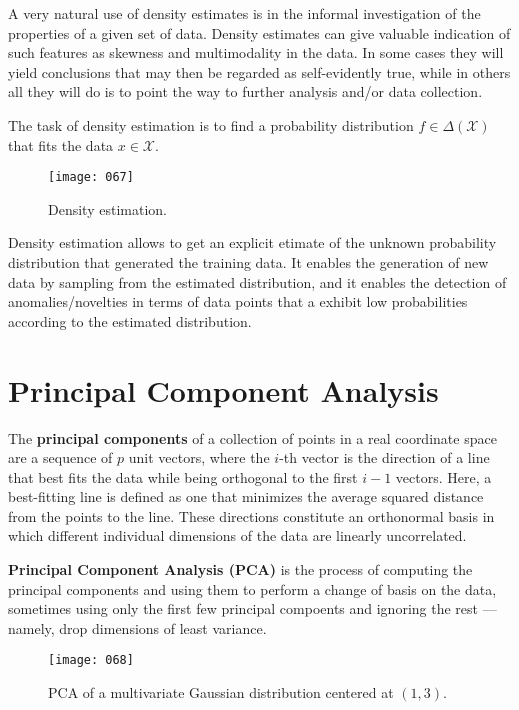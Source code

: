A very natural use of density estimates is in the informal investigation of the properties of a given set of data. Density estimates can give valuable indication of such features as skewness and multimodality in the data. In some cases they will yield conclusions that may then be regarded as self-evidently true, while in others all they will do is to point the way to further analysis and/or data collection.

The task of density estimation is to find a probability distribution \(f \in \Delta(\mathcal{X})\) that fits the data \(x \in \mathcal{X}\).

\begin{figure}[h!]
    \centering
    \texttt{[image: 067]}
    \caption{Density estimation.}
    \label{fig:067}
\end{figure}

Density estimation allows to get an explicit etimate of the unknown probability distribution that generated the training data. It enables the generation of new data by sampling from the estimated distribution, and it enables the detection of anomalies/novelties in terms of data points that a exhibit low probabilities according to the estimated distribution.

\section{Principal Component Analysis}
The \textbf{principal components} of a collection of points in a real coordinate space are a sequence of \(p\) unit vectors, where the \(i\)-th vector is the direction of a line that best fits the data while being orthogonal to the first \(i-1\) vectors. Here, a best-fitting line is defined as one that minimizes the average squared distance from the points to the line. These directions constitute an orthonormal basis in which different individual dimensions of the data are linearly uncorrelated.

\textbf{Principal Component Analysis (PCA)} is the process of computing the principal components and using them to perform a change of basis on the data, sometimes using only the first few principal compoents and ignoring the rest --- namely, drop dimensions of least variance.

\begin{figure}[t!]
    \centering
    \texttt{[image: 068]}
    \caption{PCA of a multivariate Gaussian distribution centered at \((1,3)\).}
    \label{fig:068}
\end{figure}

